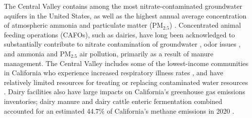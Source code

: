 \documentclass{iopjournal}
\begin{document}
The Central Valley contains among the most nitrate-contaminated groundwater aquifers \cite{Balazs_2011, USGS_2010} in the United States, as well as the highest annual average concentration of atmospheric ammonia \cite{Wang_2021} and particulate matter ($\text{PM}_{2.5}$) \cite{Chen_2020}. Concentrated animal feeding operations (CAFOs), such as dairies, have long been acknowledged to substantially contribute to nitrate contamination of groundwater \cite{Harter_Lund_2012}, odor issues \cite{Rabaud_2003, Akter_2020, Lu_2008}, and ammonia \cite{Miller_2015} and $\text{PM}_{2.5}$ air pollution, primarily as a result of manure management. The Central Valley includes some of the lowest-income communities in California who experience increased respiratory illness rates \cite{Zarate_2024}, and have relatively limited resources for treating or replacing contaminated water resources \cite{Harter_Lund_2012}. Dairy facilities also have large impacts on California's greenhouse gas emissions inventories; dairy manure and dairy cattle enteric fermentation combined accounted for an estimated 44.7\% of California's methane emissions in 2020 \cite{El_Mashad_2023, CARB_GHG_2022}. 

\end{document}
